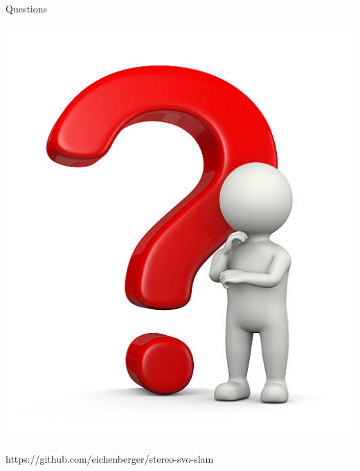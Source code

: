 \documentclass[aspectratio=169]{beamer}
\begin{document}
\begin{frame}{Questions}
  \begin{center}
    \includegraphics[height=0.9\textheight]{./img/question.jpg}
  \end{center}
  https://github.com/eichenberger/stereo-svo-slam
\end{frame}
\end{document}
